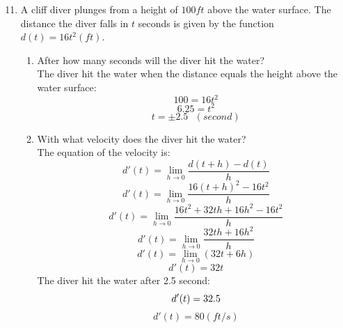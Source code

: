 \documentclass[12pt]{article}
\begin{document}
\begin{enumerate}
    \setcounter{enumi}{10}
    \item A cliff diver plunges from a height of $100 ft$ above the water surface. The distance the diver falls in $t$ seconds is given by the function $d(t) = 16t^2 (ft)$.
          \begin{enumerate}
              \item After how many seconds will the diver hit the water? \\
                    The diver hit the water when the distance equals the height above the water surface:
                    \[100 = 16t^2\]
                    \[6.25 = t^2\]
                    \[t = \pm 2.5 \text{ }(second)\]
                    \noindent{}
              \item With what velocity does the diver hit the water?\\
                    The equation of the velocity is:
                    \[ d'(t) = \lim_{h \to 0} {\displaystyle \frac{d(t + h) - d(t)}{h}}\]
                    \[ d'(t) = \lim_{h \to 0} {\displaystyle \frac{16(t+h)^2 - 16t^2}{h}}\]
                    \[ d'(t) = \lim_{h \to 0} {\displaystyle \frac{16t^2 + 32th + 16h^2 - 16t^2}{h}}\]
                    \[ d'(t) = \lim_{h \to 0} {\displaystyle \frac{32th + 16h^2}{h}}\]
                    \[ d'(t) = \lim_{h \to 0} {\displaystyle (32t + 6h)}\]
                    \[ d'(t) = 32t \]
                    The diver hit the water after 2.5 second:
                    \[ d'(t) = 32 \time 2.5\]
                    \[\boxed{ d'(t) = 80 (ft/s)}\]
          \end{enumerate}

\end{enumerate}
\end{document}
